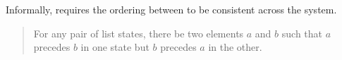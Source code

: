 
\begin{frame}{}
  \centerline{\Huge {}}
\end{frame}

\begin{frame}{}
  \begin{definition}
    Informally, \wlspec{} requires the ordering between  to be consistent across the system.
  \end{definition}

  \pause
  \vspace{1.00cm}
  \centerline{}

  \vspace{0.50cm}
  \begin{quote}
    For any pair of list states, there  be two elements $a$ and $b$ such that $a$ precedes $b$ in one state
    but $b$ precedes $a$ in the other.
  \end{quote}
\end{frame}
